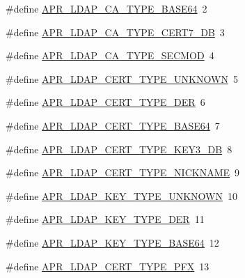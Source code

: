 \begin{DoxyCompactItemize}
\item 
\#define \hyperlink{group___a_p_r___util___l_d_a_p_ga873a9f3a55f8345e79314bcff4d2da63}{A\-P\-R\-\_\-\-L\-D\-A\-P\-\_\-\-C\-A\-\_\-\-T\-Y\-P\-E\-\_\-\-B\-A\-S\-E64}~2
\item 
\#define \hyperlink{group___a_p_r___util___l_d_a_p_gab52397cf2a484bf259c8057292baf277}{A\-P\-R\-\_\-\-L\-D\-A\-P\-\_\-\-C\-A\-\_\-\-T\-Y\-P\-E\-\_\-\-C\-E\-R\-T7\-\_\-\-D\-B}~3
\item 
\#define \hyperlink{group___a_p_r___util___l_d_a_p_gae31e900be314a4a41d6b4a80c77fc0a5}{A\-P\-R\-\_\-\-L\-D\-A\-P\-\_\-\-C\-A\-\_\-\-T\-Y\-P\-E\-\_\-\-S\-E\-C\-M\-O\-D}~4
\item 
\#define \hyperlink{group___a_p_r___util___l_d_a_p_ga330f63f481bdd6d1a2cd11b2f00931f9}{A\-P\-R\-\_\-\-L\-D\-A\-P\-\_\-\-C\-E\-R\-T\-\_\-\-T\-Y\-P\-E\-\_\-\-U\-N\-K\-N\-O\-W\-N}~5
\item 
\#define \hyperlink{group___a_p_r___util___l_d_a_p_ga83bb061671b300a894b9da953389ce5d}{A\-P\-R\-\_\-\-L\-D\-A\-P\-\_\-\-C\-E\-R\-T\-\_\-\-T\-Y\-P\-E\-\_\-\-D\-E\-R}~6
\item 
\#define \hyperlink{group___a_p_r___util___l_d_a_p_ga4e1047465f7938aa4f18602289dbdb75}{A\-P\-R\-\_\-\-L\-D\-A\-P\-\_\-\-C\-E\-R\-T\-\_\-\-T\-Y\-P\-E\-\_\-\-B\-A\-S\-E64}~7
\item 
\#define \hyperlink{group___a_p_r___util___l_d_a_p_gaabac1737dbe1c96cb71087cf3225cf33}{A\-P\-R\-\_\-\-L\-D\-A\-P\-\_\-\-C\-E\-R\-T\-\_\-\-T\-Y\-P\-E\-\_\-\-K\-E\-Y3\-\_\-\-D\-B}~8
\item 
\#define \hyperlink{group___a_p_r___util___l_d_a_p_ga126182df3d24a1144e661fd1c076de62}{A\-P\-R\-\_\-\-L\-D\-A\-P\-\_\-\-C\-E\-R\-T\-\_\-\-T\-Y\-P\-E\-\_\-\-N\-I\-C\-K\-N\-A\-M\-E}~9
\item 
\#define \hyperlink{group___a_p_r___util___l_d_a_p_ga4ec017388c41432a6a255ecb28e0ae2d}{A\-P\-R\-\_\-\-L\-D\-A\-P\-\_\-\-K\-E\-Y\-\_\-\-T\-Y\-P\-E\-\_\-\-U\-N\-K\-N\-O\-W\-N}~10
\item 
\#define \hyperlink{group___a_p_r___util___l_d_a_p_ga028ac0e4cb1e00fc43509d7d568b5495}{A\-P\-R\-\_\-\-L\-D\-A\-P\-\_\-\-K\-E\-Y\-\_\-\-T\-Y\-P\-E\-\_\-\-D\-E\-R}~11
\item 
\#define \hyperlink{group___a_p_r___util___l_d_a_p_ga13aa9e6dbfe8aa898d139bfc7ae606d1}{A\-P\-R\-\_\-\-L\-D\-A\-P\-\_\-\-K\-E\-Y\-\_\-\-T\-Y\-P\-E\-\_\-\-B\-A\-S\-E64}~12
\item 
\#define \hyperlink{group___a_p_r___util___l_d_a_p_ga6dda2a079c113e3d73b3dcae58b98357}{A\-P\-R\-\_\-\-L\-D\-A\-P\-\_\-\-C\-E\-R\-T\-\_\-\-T\-Y\-P\-E\-\_\-\-P\-F\-X}~13

\end{DoxyCompactItemize}
